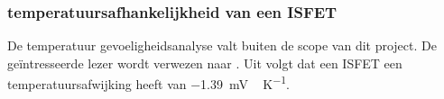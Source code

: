 
\subsubsection{temperatuursafhankelijkheid van een ISFET}
De temperatuur gevoeligheidsanalyse valt buiten de scope van dit project. De geïntresseerde lezer wordt verwezen naar \cite{isfetAsAnElectronicDevice}. Uit \cite{isfetAsAnElectronicDevice} volgt dat een ISFET een temperatuursafwijking heeft van \qty{-1.39}{\milli\volt\,\kelvin^{-1}}.




